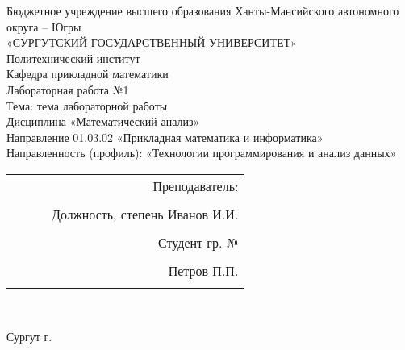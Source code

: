 \documentclass[a4paper]{article}
\begin{document}
\thispagestyle{empty}
\begin{center}

\large{Бюджетное учреждение высшего образования Ханты-Мансийского автономного округа – Югры}\\
\large{«СУРГУТСКИЙ ГОСУДАРСТВЕННЫЙ УНИВЕРСИТЕТ»}\\

\hfill \break
\normalsize{Политехнический институт}\\
 \hfill \break
\normalsize{Кафедра прикладной математики}\\
\hfill\break
\hfill \break
\hfill \break
\hfill \break
\large{Лабораторная работа №1}\\
\normalsize{Тема: тема лабораторной работы}\\
\hfill \break
\hfill \break
\hfill \break
\hfill \break
Дисциплина «Математический анализ»\\
\hfill \break
\small{Направление 01.03.02 «Прикладная математика и информатика»\\
Направленность (профиль): «Технологии программирования и анализ данных»}\\
\end{center}

\hfill \break
\hfill \break
\hfill \break
\hfill \break
\hfill \break
\hfill \break

\begin{flushright}
\normalsize{ 
\begin{tabular}{ccrr}
 & & & Преподаватель: \\\\
 & & & Должность, степень Иванов И.И. \\\\
 & & & Студент гр. № \\\\
 & & & Петров П.П. \\\\
\end{tabular}
}\\
\end{flushright}

\hfill \break
\hfill \break
\begin{center} Сургут \the\year{} г.  \end{center}
\end{document}
